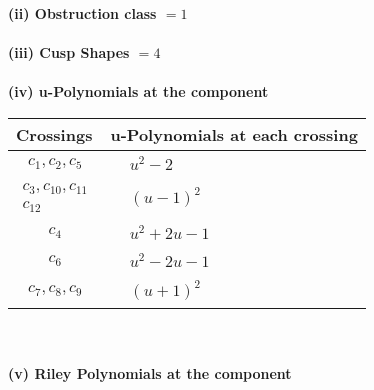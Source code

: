 \documentclass[1p]{elsarticle_modified}
\theoremstyle{definition}
\begin{document}
\flushleft \textbf{(ii) Obstruction class $= 1$}\\~\\
\flushleft \textbf{(iii) Cusp Shapes $= 4$}\\~\\
\newpage\renewcommand{\arraystretch}{1}
\flushleft \textbf{(iv) u-Polynomials at the component}\newline \\
\begin{tabular}{m{50pt}|m{274pt}}
Crossings & \hspace{64pt}u-Polynomials at each crossing \\
\hline $$\begin{aligned}c_{1},c_{2},c_{5}\end{aligned}$$&$\begin{aligned}
&u^2-2
\end{aligned}$\\
\hline $$\begin{aligned}c_{3},c_{10},c_{11}\\c_{12}\end{aligned}$$&$\begin{aligned}
&(u-1)^2
\end{aligned}$\\
\hline $$\begin{aligned}c_{4}\end{aligned}$$&$\begin{aligned}
&u^2+2 u-1
\end{aligned}$\\
\hline $$\begin{aligned}c_{6}\end{aligned}$$&$\begin{aligned}
&u^2-2 u-1
\end{aligned}$\\
\hline $$\begin{aligned}c_{7},c_{8},c_{9}\end{aligned}$$&$\begin{aligned}
&(u+1)^2
\end{aligned}$\\
\hline
\end{tabular}\\~\\
\newpage\renewcommand{\arraystretch}{1}
\flushleft \textbf{(v) Riley Polynomials at the component}\newline \\
\end{document}
